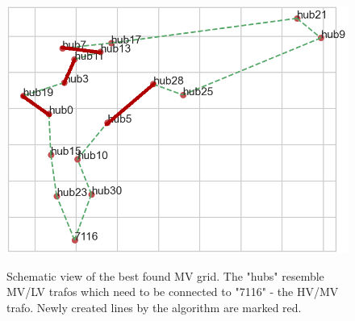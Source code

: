 \begin{figure}[h]
	\begin{centering}
		{\includegraphics[scale=0.6]{figures/experiments/1000_iter/best_mv_1000.png}}
		\caption[Result grid schematic]{Schematic view of the best found MV grid. The "hubs" resemble MV/LV trafos which need to be connected to "7116" - the HV/MV trafo. Newly created lines by the algorithm are marked red.}
		\label{fig:best_mv_1000}
	\end{centering}
\end{figure}
